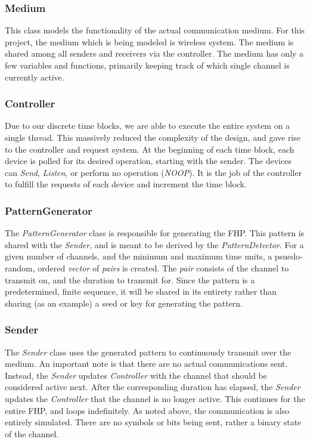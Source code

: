 \documentclass[conference]{IEEEtran}
\begin{document}
\subsubsection{Medium}

This class models the functionality of the actual communication medium.
For this project, the medium which is being modeled is wireless system.
The medium is shared among all senders and receivers via the controller.
The medium has only a few variables and functions, primarily keeping track of which single channel is currently active.

\subsubsection{Controller}

Due to our discrete time blocks, we are able to execute the entire system on a single thread.
This massively reduced the complexity of the design, and gave rise to the controller and request system.
At the beginning of each time block, each device is polled for its desired operation, starting with the sender.
The devices can \textit{Send}, \textit{Listen}, or perform no operation (\textit{NOOP}).
It is the job of the controller to fulfill the requests of each device and increment the time block.

\subsubsection{PatternGenerator}

The \textit{PatternGenerator} class is responsible for generating the FHP.
This pattern is shared with the \textit{Sender}, and is meant to be derived by the \textit{PatternDetector}.
For a given number of channels, and the minimum and maximum time units, a psuedo-random, ordered \textit{vector} of \textit{pairs} is created.
The \textit{pair} consists of the channel to transmit on, and the duration to transmit for.
Since the pattern is a predetermined, finite sequence, it will be shared in its entirety rather than sharing (as an example) a seed or key for generating the pattern.

\subsubsection{Sender}

The \textit{Sender} class uses the generated pattern to continuously transmit over the medium.
An important note is that there are no actual communications sent.
Instead, the \textit{Sender} updates \textit{Controller} with the channel that should be considered active next.
After the corresponding duration has elapsed, the \textit{Sender} updates the \textit{Controller} that the channel is no longer active.
This continues for the entire FHP, and loops indefinitely.
As noted above, the communication is also entirely simulated.
There are no symbols or bits being sent, rather a binary state of the channel.
\end{document}
